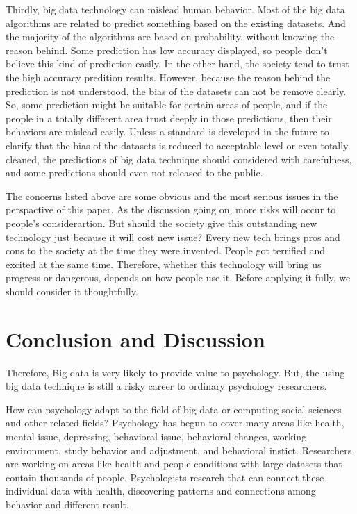 Thirdly, big data technology can mislead human behavior. Most of 
the big data algorithms are related to predict something based on 
the existing datasets. And the majority of the algorithms are based
on probability, without knowing the reason behind. Some prediction
has low accuracy displayed, so people don't believe this kind of 
prediction easily. In the other hand, the society tend to trust the
high accuracy predition results. However, because the reason behind
the prediction is not understood, the bias of the datasets can not 
be remove clearly. So, some prediction might be suitable for 
certain areas of people, and if the people in a totally different 
area trust deeply in those predictions, then their behaviors are
mislead easily. Unless a standard is developed in the future to 
clarify that the bias of the datasets is reduced to acceptable 
level or even totally cleaned, the predictions of big data 
technique should considered with carefulness, and some predictions
should even not released to the public.

The concerns listed above are some obvious and the most serious 
issues in the perspactive of this paper. As the discussion going 
on, 
more risks will occur to people's considerartion. But should the 
society give this outstanding new technology just because it will
cost new issue? Every new tech brings pros and cons to the society
at the time they were invented. People got terrified and excited 
at the same time. Therefore, whether this technology will bring us
progress or dangerous, depends on how people use it. Before 
applying it fully, we should consider it thoughtfully.


\section{Conclusion and Discussion}

Therefore, Big data is very likely to provide value to psychology.
 But, the using big data technique is still a risky career to
 ordinary psychology researchers.

How can psychology adapt to the field of big data or computing 
social sciences and other related fields? Psychology has begun to 
cover many areas like health, mental issue, depressing, behavioral
 issue, behavioral changes, working environment, study behavior 
and adjustment, and behavioral instict. Researchers are working on 
areas like health and people conditions with large datasets that
 contain thousands of people. Psychologists research that 
can connect these individual data with health, 
discovering patterns and connections among behavior and different 
result.

